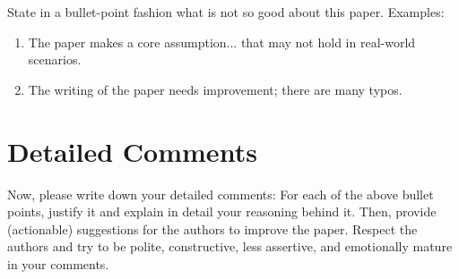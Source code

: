 \documentclass{upb-cn}
\begin{document}
State in a bullet-point fashion what is not so good about this paper. Examples:

\begin{enumerate}
    \item The paper makes a core assumption... that may not hold in real-world scenarios.
    \item The writing of the paper needs improvement; there are many typos.
\end{enumerate}

\section{Detailed Comments}
\label{sec:comments}

Now, please write down your detailed comments: For each of the above bullet points, justify it and explain in detail your reasoning behind it. Then, provide (actionable) suggestions for the authors to improve the paper. Respect the authors and try to be polite, constructive, less assertive, and emotionally mature in your comments.
\end{document}

